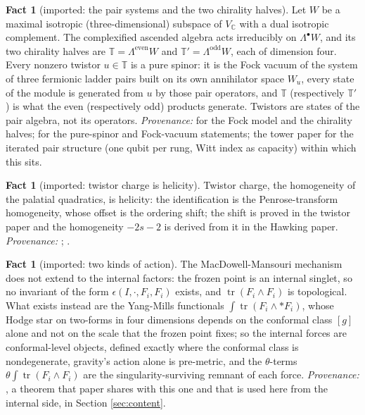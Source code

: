 \documentclass[11pt]{article}
\theoremstyle{definition}
\newtheorem{fact}[theorem]{Fact}
\newcommand{\C}{\mathbb{C}}
\newcommand{\T}{\mathbb{T}}
\newcommand{\tr}{\operatorname{tr}}
\begin{document}
\begin{fact}[imported: the pair systems and the two chirality halves]\label{fact:pairs}
Let $W$ be a maximal isotropic (three-dimensional) subspace of $V_{\C}$ with a dual isotropic complement. The complexified ascended algebra acts irreducibly on $\Lambda^{\bullet}W$, and its two chirality halves are $\T = \Lambda^{\mathrm{even}}W$ and $\T' = \Lambda^{\mathrm{odd}}W$, each of dimension four. Every nonzero twistor $u \in \T$ is a pure spinor: it is the Fock vacuum of the system of three fermionic ladder pairs built on its own annihilator space $W_{u}$, every state of the module is generated from $u$ by those pair operators, and $\T$ (respectively $\T'$) is what the even (respectively odd) products generate. Twistors are states of the pair algebra, not its operators. \emph{Provenance:} \cite[Thm.~3.1]{ButlerT9} for the Fock model and the chirality halves; \cite[Thm.~5.3]{ButlerT9} for the pure-spinor and Fock-vacuum statements; the tower paper \cite[Thms.~4.2, 4.3]{ButlerT3} for the iterated pair structure (one qubit per rung, Witt index as capacity) within which this sits.
\end{fact}

\begin{fact}[imported: twistor charge is helicity]\label{fact:helicity}
Twistor charge, the homogeneity of the palatial quadratics, is helicity: the identification is the Penrose-transform homogeneity, whose offset is the ordering shift; the shift is proved in the twistor paper and the homogeneity $-2s-2$ is derived from it in the Hawking paper. \emph{Provenance:} \cite[Thm.~5.7]{ButlerT9}; \cite[Prop.~5.2]{ButlerT7}.
\end{fact}

\begin{fact}[imported: two kinds of action]\label{fact:twokinds}
The MacDowell-Mansouri mechanism does not extend to the internal factors: the frozen point is an internal singlet, so no invariant of the form $\epsilon(I, \cdot, F_{i}, F_{i})$ exists, and $\tr(F_{i} \wedge F_{i})$ is topological. What exists instead are the Yang-Mills functionals $\int \tr(F_{i} \wedge {*}F_{i})$, whose Hodge star on two-forms in four dimensions depends on the conformal class $[g]$ alone and not on the scale that the frozen point fixes; so the internal forces are conformal-level objects, defined exactly where the conformal class is nondegenerate, gravity's action alone is pre-metric, and the $\theta$-terms $\theta\int\tr(F_{i} \wedge F_{i})$ are the singularity-surviving remnant of each force. \emph{Provenance:} \cite[Thm.~4.3]{ButlerT10}, a theorem that paper shares with this one and that is used here from the internal side, in Section \ref{sec:content}.
\end{fact}
\end{document}
